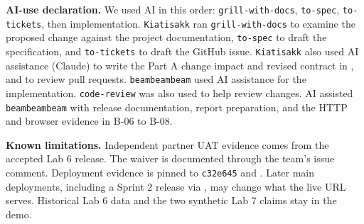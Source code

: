 \textbf{AI-use declaration.}
We used AI in this order: \texttt{grill-with-docs}, \texttt{to-spec}, \texttt{to-tickets}, then implementation. \texttt{Kiatisakk} ran \texttt{grill-with-docs} to examine the proposed change against the project documentation, \texttt{to-spec} to draft the specification, and \texttt{to-tickets} to draft the GitHub issue. \texttt{Kiatisakk} also used AI assistance (Claude) to write the Part A change impact and revised contract in , and to review pull requests. \texttt{beambeambeam} used AI assistance for the implementation. \texttt{code-review} was also used to help review changes. AI assisted \texttt{beambeambeam} with release documentation, report preparation, and the HTTP and browser evidence in B-06 to B-08.

\textbf{Known limitations.}
Independent partner UAT evidence comes from the accepted Lab 6 release. The waiver is documented through the team's issue comment. Deployment evidence is pinned to \texttt{c32e645} and \revision{}. Later main deployments, including a Sprint 2 release via , may change what the live URL serves. Historical Lab 6 data and the two synthetic Lab 7 claims stay in the demo.
